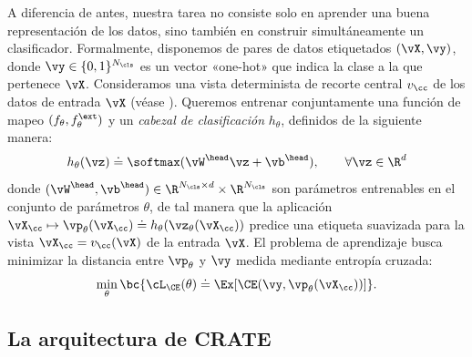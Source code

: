 \documentclass[../../book-main_es.tex]{subfiles}
\begin{document}
A diferencia de antes, nuestra tarea no consiste solo en aprender una buena representación de
los datos, sino también en construir simultáneamente un clasificador. Formalmente,
disponemos de pares de datos etiquetados \((\vX, \vy)\), donde \(\vy \in \{0,
1\}^{N_{\cls}}\) es un vector «one-hot» que indica la clase a la que pertenece
\(\vX\). Consideramos una vista determinista de recorte central
\(v_{\cc}\) de los datos de entrada \(\vX\) (véase
). Queremos entrenar conjuntamente
una función de mapeo \((f_{\theta}, f_{\theta}^{\ext})\) y un
\textit{cabezal de clasificación} \(h_{\theta}\), definidos de la siguiente manera:
\begin{equation}
h_{\theta}(\vz) \doteq \softmax(\vW^{\head}\vz + \vb^{\head}), \qquad
\forall \vz \in \R^{d}
\end{equation}
donde \((\vW^{\head}, \vb^{\head}) \in \R^{N_{\cls} \times d} \times
\R^{N_{\cls}}\) son parámetros entrenables en el conjunto de parámetros
\(\theta\), de tal manera que la aplicación \(\vX_{\cc} \mapsto
\vp_{\theta}(\vX_{\cc}) \doteq h_{\theta}(\vz_{\theta}(\vX_{\cc}))\)
predice una etiqueta suavizada para la vista \(\vX_{\cc} = v_{\cc}(\vX)\)
de la entrada \(\vX\). El problema de aprendizaje busca minimizar la
distancia entre \(\vp_{\theta}\) y \(\vy\) medida mediante entropía cruzada:
\begin{equation}\label{eq:classification_ce_loss}
\min_{\theta}\bc{\cL_{\CE}(\theta) \doteq \Ex[\CE(\vy,
\vp_{\theta}(\vX_{\cc}))]}.
\end{equation}

\subsection{La arquitectura de CRATE}\label{sub:image_classification_architecture}
\end{document}

